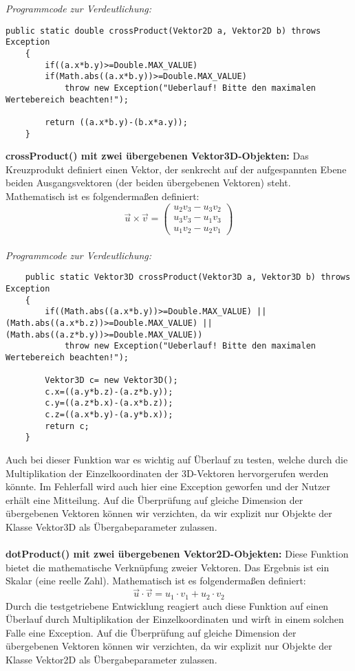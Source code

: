 \documentclass[a4paper,11pt]{scrartcl}
\begin{document}
\textit{Programmcode zur Verdeutlichung:}
\begin{lstlisting}
public static double crossProduct(Vektor2D a, Vektor2D b) throws Exception
	{
		if((a.x*b.y)>=Double.MAX_VALUE)
		if(Math.abs((a.x*b.y))>=Double.MAX_VALUE)
			throw new Exception("Ueberlauf! Bitte den maximalen Wertebereich beachten!");
		
		return ((a.x*b.y)-(b.x*a.y));
	}
\end{lstlisting} $\;$ \\
\textbf{crossProduct() mit zwei übergebenen Vektor3D-Objekten:} Das Kreuzprodukt definiert einen Vektor, der senkrecht auf der aufgespannten Ebene beiden Ausgangsvektoren (der beiden übergebenen Vektoren) steht. 
Mathematisch ist es folgendermaßen definiert:
\[ \vec u \times \vec v = \begin{pmatrix}
u_2v_3 - u_3v_2\\
u_3v_3 - u_1v_3\\
u_1v_2 - u_2v_1
\end{pmatrix}\]
\\
\textit{Programmcode zur Verdeutlichung:}
\begin{lstlisting}
	public static Vektor3D crossProduct(Vektor3D a, Vektor3D b) throws Exception
	{
		if((Math.abs((a.x*b.y))>=Double.MAX_VALUE) || (Math.abs((a.x*b.z))>=Double.MAX_VALUE) || (Math.abs((a.z*b.y))>=Double.MAX_VALUE))
			throw new Exception("Ueberlauf! Bitte den maximalen Wertebereich beachten!");
		
		Vektor3D c= new Vektor3D();
		c.x=((a.y*b.z)-(a.z*b.y));
		c.y=((a.z*b.x)-(a.x*b.z));
		c.z=((a.x*b.y)-(a.y*b.x));
		return c;
	}
\end{lstlisting} 
Auch bei dieser Funktion war es wichtig auf Überlauf zu testen, welche durch die Multiplikation der Einzelkoordinaten der 3D-Vektoren hervorgerufen werden könnte. Im Fehlerfall wird auch hier eine Exception geworfen und der Nutzer erhält eine Mitteilung. Auf die Überprüfung auf gleiche Dimension der übergebenen Vektoren können wir verzichten, da wir explizit nur Objekte der Klasse Vektor3D als Übergabeparameter zulassen.\\
\\
\textbf{dotProduct() mit zwei übergebenen Vektor2D-Objekten:} Diese Funktion bietet die mathematische Verknüpfung zweier Vektoren. Das Ergebnis ist ein Skalar (eine reelle Zahl).
Mathematisch ist es folgendermaßen definiert:
\[ \vec u \cdot \vec v = u_1 \cdot v_1 + u_2 \cdot v_2\]
Durch die testgetriebene Entwicklung reagiert auch diese Funktion auf einen Überlauf durch Multiplikation der Einzelkoordinaten und wirft in einem solchen Falle eine Exception. Auf die Überprüfung auf gleiche Dimension der übergebenen Vektoren können wir verzichten, da wir explizit nur Objekte der Klasse Vektor2D als Übergabeparameter zulassen.\\
\end{document}
